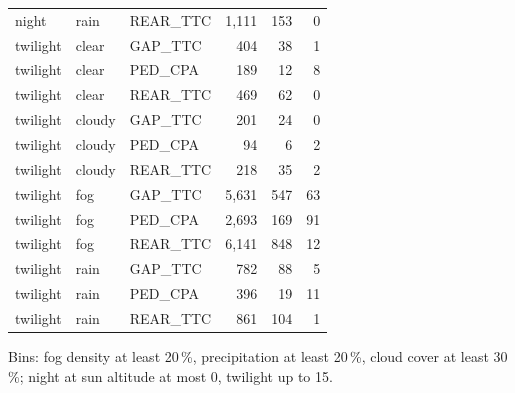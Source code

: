 \begin{table}[htbp]
\begin{tabular}{@{}lllrrr@{}}
night & rain & REAR\_TTC & 1,111 & 153 & 0 \\
twilight & clear & GAP\_TTC & 404 & 38 & 1 \\
twilight & clear & PED\_CPA & 189 & 12 & 8 \\
twilight & clear & REAR\_TTC & 469 & 62 & 0 \\
twilight & cloudy & GAP\_TTC & 201 & 24 & 0 \\
twilight & cloudy & PED\_CPA & 94 & 6 & 2 \\
twilight & cloudy & REAR\_TTC & 218 & 35 & 2 \\
twilight & fog & GAP\_TTC & 5,631 & 547 & 63 \\
twilight & fog & PED\_CPA & 2,693 & 169 & 91 \\
twilight & fog & REAR\_TTC & 6,141 & 848 & 12 \\
twilight & rain & GAP\_TTC & 782 & 88 & 5 \\
twilight & rain & PED\_CPA & 396 & 19 & 11 \\
twilight & rain & REAR\_TTC & 861 & 104 & 1 \\
\bottomrule
\end{tabular}
\par\smallskip\footnotesize\raggedright Bins: fog density at least 20\,\%, precipitation at least 20\,\%, cloud cover at least 30\,\%; night at sun altitude at most 0\textdegree, twilight up to 15\textdegree.
\end{table}

